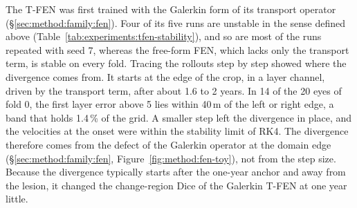 The T-FEN was first trained with the Galerkin form of its transport
operator (\S\ref{sec:method:family:fen}). Four of its five runs are
unstable in the sense defined above
(Table~\ref{tab:experiments:tfen-stability}), and so are most of the runs
repeated with seed 7, whereas the free-form FEN, which lacks only the transport term, is stable on every
fold. Tracing the rollouts step by step showed where the divergence comes
from. It starts at the edge of the crop, in a layer channel, driven by the
transport term, after about 1.6 to 2 years. In 14 of
the 20 eyes of fold 0, the first layer error above 5 lies within
40\,\textmu{}m of the left or right edge, a band that holds 1.4\,\% of the
grid.
A smaller step left the divergence in place, and the velocities at the onset
were within the stability limit of RK4. The divergence therefore comes from
the defect of the Galerkin operator at the domain edge
(\S\ref{sec:method:family:fen}, Figure~\ref{fig:method:fen-toy}), not from
the step size. Because the divergence typically starts after the one-year
anchor and away from the lesion, it changed the change-region Dice of the
Galerkin T-FEN at one year little.

